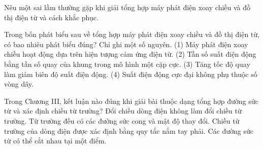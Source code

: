 \begin{bt}
Nêu một sai lầm thường gặp khi giải tổng hợp máy phát điện xoay chiều và đồ thị điện từ và cách khắc phục.
\end{bt}

\begin{ex}
Trong bốn phát biểu sau về tổng hợp máy phát điện xoay chiều và đồ thị điện từ, có bao nhiêu phát biểu đúng? Chỉ ghi một số nguyên. (1) Máy phát điện xoay chiều hoạt động dựa trên hiện tượng cảm ứng điện từ. (2) Tần số suất điện động bằng tần số quay của khung trong mô hình một cặp cực. (3) Tăng tốc độ quay làm giảm biên độ suất điện động. (4) Suất điện động cực đại không phụ thuộc số vòng dây.
\end{ex}

\begin{ex}
Trong Chương III, kết luận nào đúng khi giải bài thuộc dạng tổng hợp đường sức từ và xác định chiều từ trường?
\choice
{Đổi chiều dòng điện không làm đổi chiều từ trường.}
{Từ trường đều có các đường sức cong và mật độ thay đổi.}
{\True Chiều từ trường của dòng điện được xác định bằng quy tắc nắm tay phải.}
{Các đường sức từ có thể cắt nhau tại một điểm.}
\end{ex}

